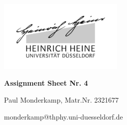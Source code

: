 \documentclass[12pt,a4paper]{article}	%
\begin{document}

\setlength{\parindent}{0pt}


\thispagestyle{empty}

\begin{titlepage}
	\centering
	\includegraphics[width=0.45\textwidth]{logo_sw.jpg}\par\vspace{1cm}
	\vspace{1cm}
	\vspace{1.5cm}
	{\LARGE\bfseries Assignment Sheet Nr. 4\\  \par}
	\vspace{1cm}
	
	{\large	Paul Monderkamp, Matr.Nr. 2321677\par}
	\vfill
	

	\vfill

	{\large  monderkamp@thphy.uni-duesseldorf.de \par}
	\vspace{2cm}
\end{titlepage}

\thispagestyle{empty} %
\newpage	%
\end{document}
